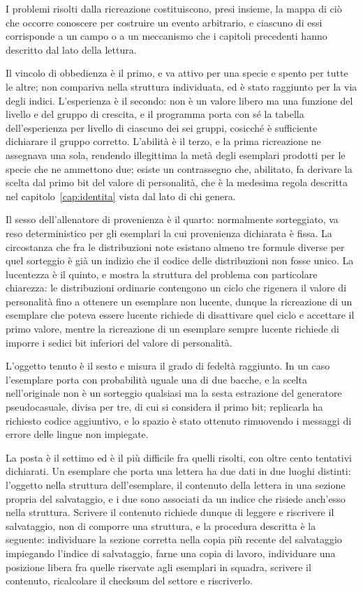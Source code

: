 I problemi risolti dalla ricreazione costituiscono, presi insieme, la mappa di ciò che occorre conoscere per costruire un evento arbitrario, e ciascuno di essi corrisponde a un campo o a un meccanismo che i capitoli precedenti hanno descritto dal lato della lettura.

Il vincolo di obbedienza è il primo, e va attivo per una specie e spento per tutte le altre; non compariva nella struttura individuata, ed è stato raggiunto per la via degli indici. L'esperienza è il secondo: non è un valore libero ma una funzione del livello e del gruppo di crescita, e il programma porta con sé la tabella dell'esperienza per livello di ciascuno dei sei gruppi, cosicché è sufficiente dichiarare il gruppo corretto. L'abilità è il terzo, e la prima ricreazione ne assegnava una sola, rendendo illegittima la metà degli esemplari prodotti per le specie che ne ammettono due; esiste un contrassegno che, abilitato, fa derivare la scelta dal primo bit del valore di personalità, che è la medesima regola descritta nel capitolo~\ref{cap:identita} vista dal lato di chi genera.

Il sesso dell'allenatore di provenienza è il quarto: normalmente sorteggiato, va reso deterministico per gli esemplari la cui provenienza dichiarata è fissa. La circostanza che fra le distribuzioni note esistano almeno tre formule diverse per quel sorteggio è già un indizio che il codice delle distribuzioni non fosse unico. La lucentezza è il quinto, e mostra la struttura del problema con particolare chiarezza: le distribuzioni ordinarie contengono un ciclo che rigenera il valore di personalità fino a ottenere un esemplare non lucente, dunque la ricreazione di un esemplare che poteva essere lucente richiede di disattivare quel ciclo e accettare il primo valore, mentre la ricreazione di un esemplare sempre lucente richiede di imporre i sedici bit inferiori del valore di personalità.

L'oggetto tenuto è il sesto e misura il grado di fedeltà raggiunto. In un caso l'esemplare porta con probabilità uguale una di due bacche, e la scelta nell'originale non è un sorteggio qualsiasi ma la sesta estrazione del generatore pseudocasuale, divisa per tre, di cui si considera il primo bit; replicarla ha richiesto codice aggiuntivo, e lo spazio è stato ottenuto rimuovendo i messaggi di errore delle lingue non impiegate.

La posta è il settimo ed è il più difficile fra quelli risolti, con oltre cento tentativi dichiarati. Un esemplare che porta una lettera ha due dati in due luoghi distinti: l'oggetto nella struttura dell'esemplare, il contenuto della lettera in una sezione propria del salvataggio, e i due sono associati da un indice che risiede anch'esso nella struttura. Scrivere il contenuto richiede dunque di leggere e riscrivere il salvataggio, non di comporre una struttura, e la procedura descritta è la seguente: individuare la sezione corretta nella copia più recente del salvataggio impiegando l'indice di salvataggio, farne una copia di lavoro, individuare una posizione libera fra quelle riservate agli esemplari in squadra, scrivere il contenuto, ricalcolare il checksum del settore e riscriverlo.

